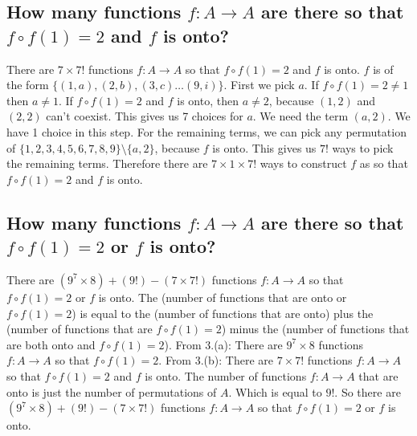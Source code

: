 \documentclass[10pt, letterpaper, titlepage]{article}
\newcommand{\0}{\varnothing}
\newcommand{\1}{\{ 1 \}}
\newcommand{\2}{\{ (1,1) \}}
\begin{document}
        \subsection{How many functions $f:A \to A$ are there so that $f \circ f(1) = 2$ and $f$ is onto?}
            There are $7\times 7!$ functions $f: A\to A$ so that $f\circ f(1) =2$ and $f$ is onto.
            $f$ is of the form $\{(1, a), (2,b),(3,c) \hdots (9,i)\}$.
            First we pick $a$. If $f\circ f(1)=2 \neq 1$ then $a \neq 1$. If $f\circ f(1) = 2$ and $f$ is onto, then $a \neq 2$,
            because $(1,2)$ and $(2,2)$ can't coexist. This gives us 7 choices for $a$.
            We need the term $(a,2)$. We have 1 choice in this step.
            For the remaining terms, we can pick any permutation of $\{1,2,3,4,5,6,7,8,9\} \setminus \{a, 2\}$,
            because $f$ is onto. This gives us $7!$ ways to pick the remaining terms.
            Therefore there are $7\times 1\times 7!$ ways to construct $f$ as so that $f\circ f(1) =2$ and $f$ is onto.

        \subsection{How many functions $f:A \to A$ are there so that $f \circ f(1) = 2$ or $f$ is onto?}
            There are $(9^7\times 8)+(9!)-(7\times 7!)$ functions $f: A\to A$ so that $f\circ f(1) = 2$ or $f$ is onto.
            The (number of functions that are onto or $f\circ f(1) = 2$)
            is equal to the (number of functions that are onto)
            plus the (number of functions that are $f\circ f(1) = 2$)
            minus the (number of functions that are both onto and $f\circ f(1) = 2$).
            From 3.(a): There are $9^7 \times 8$ functions $f: A\to A$ so that $f\circ f(1) =2$.
            From 3.(b): There are $7\times 7!$ functions $f: A\to A$ so that $f\circ f(1) =2$ and $f$ is onto.
            The number of functions $f: A\to A$ that are onto is just the number of permutations of $A$.
            Which is equal to $9!$.
            So there are $(9^7\times 8)+(9!)-(7\times 7!)$ functions $f: A\to A$ so that $f\circ f(1) = 2$ or $f$ is onto.
        
\end{document}
